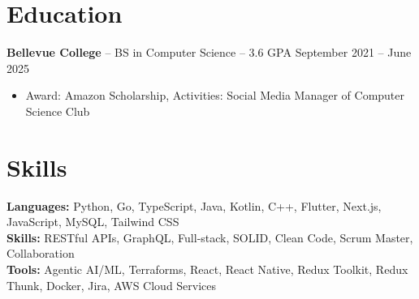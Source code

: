 \documentclass[11pt]{article}       %
\begin{document}

\vspace{-18.5pt}

\section*{Education}
\textbf{Bellevue College} -- BS in Computer Science -- 3.6 GPA \hfill September 2021 -- June 2025\\
\vspace{-9pt}
\begin{itemize}
  \item Award: Amazon Scholarship, Activities: Social Media Manager of Computer Science Club
\end{itemize}

\vspace{-18.5pt}

\section*{Skills}
\textbf{Languages:} Python, Go, TypeScript, Java, Kotlin, C++, Flutter, Next.js, JavaScript, MySQL, Tailwind CSS\\
\textbf{Skills:} RESTful APIs, GraphQL, Full-stack, SOLID, Clean Code, Scrum Master, Collaboration\\
\textbf{Tools:} Agentic AI/ML, Terraforms, React, React Native, Redux Toolkit, Redux Thunk, Docker, Jira, AWS Cloud Services\\

\vspace{-6.5pt}
\end{document}
